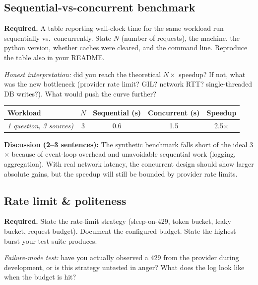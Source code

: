 \documentclass[11pt,a4paper]{article}
\begin{document}
\subsection{Sequential-vs-concurrent benchmark}

\begin{deliverbox}
\textbf{Required.} A table reporting wall-clock time for the same workload run sequentially vs.\ concurrently. State $N$ (number of requests), the machine, the python version, whether caches were cleared, and the command line. Reproduce the table also in your README.
\end{deliverbox}

\begin{probebox}
\textit{Honest interpretation:} did you reach the theoretical $N\times$ speedup? If not, what was the new bottleneck (provider rate limit? GIL? network RTT? single-threaded DB writes?). What would push the curve further?
\end{probebox}

\begin{center}\small
\begin{tabular}{lcccc}
\toprule
\textbf{Workload} & $N$ & \textbf{Sequential (s)} & \textbf{Concurrent (s)} & \textbf{Speedup} \\
\midrule
\textit{1 question, 3 sources)} & 3 & 0.6 & 1.5 & 2.5$\times$ \\
\bottomrule
\end{tabular}
\end{center}

\textbf{Discussion (2--3 sentences):} The synthetic benchmark  falls short of the ideal 3$\times$ because of event-loop overhead and unavoidable sequential work (logging, aggregation). With real network latency, the concurrent design should show larger absolute gains, but the speedup will still be bounded by provider rate limits.

\subsection{Rate limit \& politeness}

\begin{deliverbox}
\textbf{Required.} State the rate-limit strategy (sleep-on-429, token bucket, leaky bucket, request budget). Document the configured budget. State the highest burst your test suite produces.
\end{deliverbox}

\begin{probebox}
\textit{Failure-mode test:} have you actually observed a 429 from the provider during development, or is this strategy untested in anger? What does the log look like when the budget is hit?
\end{probebox}
\end{document}
